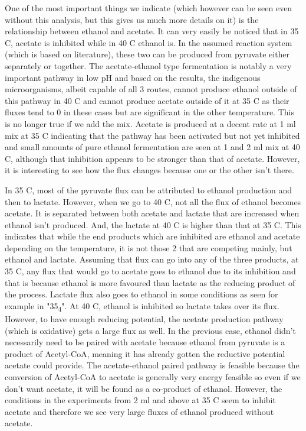 \documentclass[11pt]{article}
\begin{document}
One of the most important things we indicate (which however can be seen even without this analysis, but this gives us much more details on it) is the relationship between ethanol and acetate. It can very easily be noticed that in 35 C, acetate is inhibited while in 40 C ethanol is. In the assumed reaction system (which is based on literature), these two can be produced from pyruvate either separately or together. The acetate-ethanol type fermentation is notably a very important pathway in low pH and based on the results, the indigenous microorganisms, albeit capable of all 3 routes, cannot produce ethanol outside of this pathway in 40 C and cannot produce acetate outside of it at 35 C as their fluxes tend to 0 in these cases but are significant in the other temperature. This is no longer true if we add the mix. Acetate is produced at a decent rate at 1 ml mix at 35 C indicating that the pathway has been activated but not yet inhibited and small amounts of pure ethanol fermentation are seen at 1 and 2 ml mix at 40 C, although that inhibition appears to be stronger than that of acetate. However, it is interesting to see how the flux changes because one or the other isn't there.

In 35 C, most of the pyruvate flux can be attributed to ethanol production and then to lactate. However, when we go to 40 C, not all the flux of ethanol becomes acetate. It is separated between both acetate and lactate that are increased when ethanol isn't produced. And, the lactate at 40 C is higher than that at 35 C. This indicates that while the end products which are inhibited are ethanol and acetate depending on the temperature, it is not those 2 that are competing mainly, but ethanol and lactate. Assuming that flux can go into any of the three products, at 35 C, any flux that would go to acetate goes to ethanol due to its inhibition and that is because ethanol is more favoured than lactate as the reducing product of the process. Lactate flux also goes to ethanol in some conditions as seen for example in "35\textsubscript{4}". At 40 C, ethanol is inhibited so lactate takes over its flux. However, to have enough reducing potential, the acetate production pathway (which is oxidative) gets a large flux as well. In the previous case, ethanol didn't necessarily need to be paired with acetate because ethanol from pyruvate is a product of Acetyl-CoA, meaning it has already gotten the reductive potential acetate could provide. The acetate-ethanol paired pathway is feasible because the conversion of Acetyl-CoA to acetate is generally very energy feasible so even if we don't want acetate, it will be found as a co-product of ethanol. However, the conditions in the experiments from 2 ml and above at 35 C seem to inhibit acetate and therefore we see very large fluxes of ethanol produced without acetate.
\end{document}
